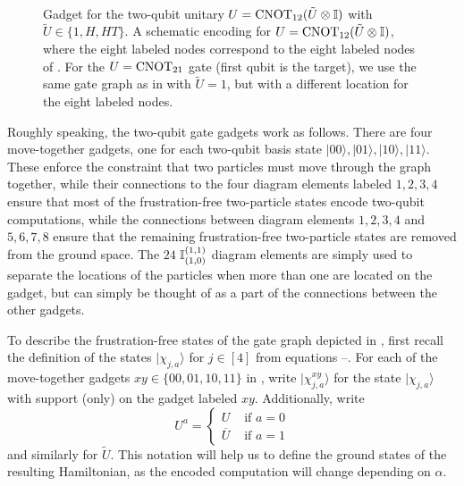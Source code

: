 \documentclass[../thesis-main/thesis-main]{subfiles}
\begin{document}
\begin{figure}
\centering 
{}\\
\caption{ Gadget for the
 two-qubit unitary $U=\mathrm{CNOT}_{12}(\tilde U\otimes\mathbb{I})$ with $\tilde U\in \{1,H,HT\}$.  A schematic encoding for $U=\mathrm{CNOT}_{12}(\tilde U\otimes \mathbb{I})$, where the eight labeled nodes correspond to the eight labeled nodes of .
 For the $U=\mathrm{CNOT}_{21}$ gate (first qubit is the target), we use the same gate graph as in  with $\tilde U=1$, but with a different location for the eight labeled nodes.}
\label{fig:GVcnot_tot}
\end{figure}

Roughly speaking, the two-qubit gate gadgets work as follows.  There are four move-together gadgets, one for each two-qubit basis state $|00\rangle, |01\rangle, |10\rangle, |11\rangle$. These enforce the constraint that two particles must move through the graph together, while their connections to the four diagram elements labeled $1,2,3,4$ ensure that most of the frustration-free two-particle states encode two-qubit computations, while the connections between diagram elements $1,2,3,4$ and $5,6,7,8$ ensure that the remaining frustration-free two-particle states are removed from the ground space.   The $24$ $\mathbb{I}_{(1,0)}^{(1,1)}$ diagram elements are simply used to separate the locations of the particles when more than one are located on the gadget, but can simply be thought of as a part of the connections between the other gadgets.

To describe the frustration-free states of the gate graph depicted in , first recall the definition of the states $|\chi_{j,a}\rangle$ for $j\in [4]$  from equations --. For each of the move-together gadgets $xy\in\{00,01,10,11\}$ in , write 
$
|\chi_{j,a}^{xy}\rangle
$
for the state $|\chi_{j,a}\rangle$ with support (only) on the gadget labeled $xy$. Additionally, write 
\begin{equation}
  U^a=\begin{cases}
    U & \text{ if }a=0\\
    \overline{U} & \text{ if }a=1
  \end{cases}
\end{equation}
and similarly for $\tilde U$.  This notation will help us to define the ground states of the resulting Hamiltonian, as the encoded computation will change depending on $\alpha$.
\end{document}
